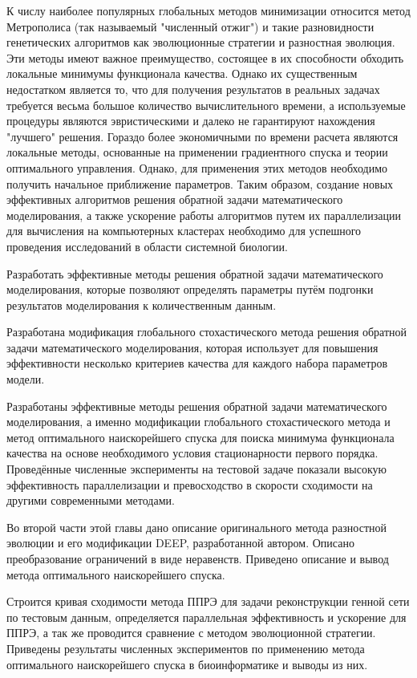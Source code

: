 К числу наиболее популярных глобальных методов минимизации относится метод Метрополиса (так называемый "численный отжиг") и такие разновидности генетических алгоритмов как эволюционные стратегии и разностная эволюция. Эти методы имеют важное преимущество, состоящее в их способности обходить локальные минимумы функционала качества. Однако их существенным недостатком является то, что для получения результатов в реальных задачах требуется весьма большое количество вычислительного времени, а используемые процедуры являются эвристическими и далеко не гарантируют нахождения "лучшего" решения. Гораздо более экономичными по времени расчета являются локальные методы, основанные на применении градиентного спуска и теории оптимального управления. Однако, для применения этих методов необходимо получить начальное приближение параметров. Таким образом, создание новых эффективных алгоритмов решения обратной задачи математического моделирования, а также ускорение работы алгоритмов путем их параллелизации для вычисления на компьютерных кластерах необходимо для успешного проведения исследований в области системной биологии.

Разработать эффективные методы решения обратной задачи математического моделирования, которые позволяют определять параметры путём подгонки результатов моделирования к количественным данным.

Разработана модификация глобального стохастического метода решения обратной задачи математического моделирования, которая использует для повышения эффективности несколько критериев качества для каждого набора параметров модели.

Разработаны эффективные методы решения обратной задачи математического моделирования, а именно модификации глобального стохастического метода и метод оптимального наискорейшего спуска для поиска минимума функционала качества на основе необходимого условия стационарности первого порядка. Проведённые численные эксперименты на тестовой задаче показали высокую эффективность параллелизации и превосходство в скорости сходимости на другими современными методами.

Во второй части этой главы дано описание оригинального метода разностной эволюции и его модификации DEEP, разработанной автором. Описано преобразование ограничений в виде неравенств. Приведено описание и вывод метода оптимального наискорейшего спуска.

Строится кривая сходимости метода ППРЭ для задачи реконструкции генной сети по тестовым данным, определяется параллельная эффективность и ускорение для ППРЭ, а так же проводится сравнение с методом эволюционной стратегии. Приведены результаты численных экспериментов по применению метода оптимального наискорейшего спуска в биоинформатике и выводы из них.


